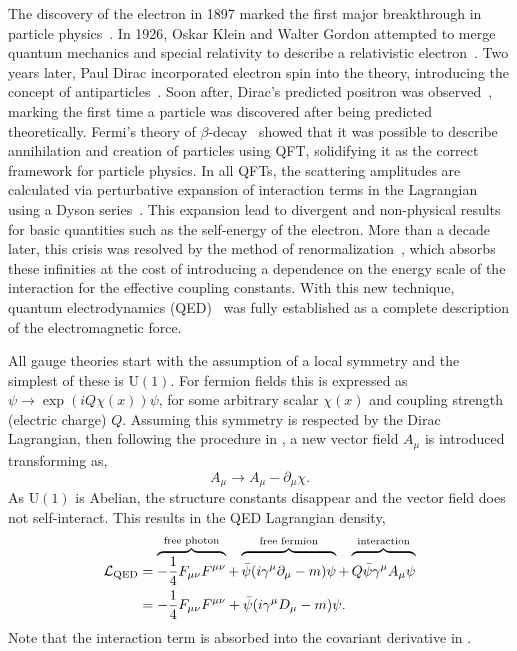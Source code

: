 The discovery of the electron in 1897 marked the first major breakthrough in particle physics~\cite{ThomsonElectron}.
In 1926, Oskar Klein and Walter Gordon attempted to merge quantum mechanics and special relativity to describe a relativistic electron~\cite{Klein1926,Gordon1926}.
Two years later, Paul Dirac incorporated electron spin into the theory, introducing the concept of antiparticles~\cite{Dirac1928}.
Soon after, Dirac's predicted positron was observed~\cite{PositiveElectron}, marking the first time a particle was discovered after being predicted theoretically.
Fermi's theory of $\beta$-decay~\cite{Fermi1934} showed that it was possible to describe annihilation and creation of particles using QFT\@, solidifying it as the correct framework for particle physics.
In all QFTs, the scattering amplitudes are calculated via perturbative expansion of interaction terms in the Lagrangian using a Dyson series~\cite{AlexQED4}.
This expansion lead to divergent and non-physical results for basic quantities such as the self-energy of the electron.
More than a decade later, this crisis was resolved by the method of renormalization~\cite{Renorm1,Renorm2,Renorm3,Renorm4,Renorm5,Renorm6,Renorm7,Renorm8,Renorm9,Renorm10,Renorm11,Renorm12}, which absorbs these infinities at the cost of introducing a dependence on the energy scale of the interaction for the effective coupling constants.
With this new technique, quantum electrodynamics (QED)~\cite{AlexQED1,AlexQED2,AlexQED3} was fully established as a complete description of the electromagnetic force.

All gauge theories start with the assumption of a local symmetry and the simplest of these is $\text{U}(1)$.
For fermion fields this is expressed as $\psi \rightarrow \exp{\left(i Q \chi(x)\right)} \psi$, for some arbitrary scalar $\chi(x)$ and coupling strength (electric charge) $Q$.
Assuming this symmetry is respected by the Dirac Lagrangian, then following the procedure in , a new vector field $A_\mu$ is introduced transforming as,
\begin{equation}
	\label{eq:photon_transformation}
	A_\mu \rightarrow A_\mu - \partial_\mu \chi.
\end{equation}
As $\text{U}(1)$ is Abelian, the structure constants disappear and the vector field does not self-interact.
This results in the QED Lagrangian density,
\begin{align}
	\mathcal{L}_\text{QED} & = \overbrace{-\frac{1}{4} F_{\mu\nu} F^{\mu\nu}}^{\text{free photon}}
	+ \overbrace{\vphantom{\frac{1}{1}}\bar \psi (i \gamma^\mu \partial_\mu - m) \psi}^{\text{free fermion}}
	+ \overbrace{\vphantom{\frac{1}{1}}Q \bar \psi \gamma^\mu A_\mu \psi}^{\text{interaction}}               \\
	                       & = -\frac{1}{4} F_{\mu\nu} F^{\mu\nu} + \bar \psi (i \gamma^\mu D_\mu - m) \psi.
	\label{eq:qed_lagrangian}
\end{align}
Note that the interaction term is absorbed into the covariant derivative in .

